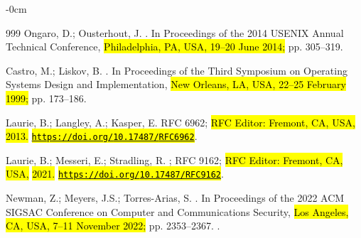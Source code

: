 \documentclass[blockchains,review,accept,moreauthors]{Definitions/mdpi}
\begin{document}
\begin{adjustwidth}{-\extralength}{0cm}
\begin{thebibliography}{999}
Ongaro, D.; Ousterhout, J.
.
\newblock In Proceedings of the 2014 USENIX Annual Technical Conference, \hl{Philadelphia, PA, USA, 19--20 June 2014;}
  pp. 305--319.

Castro, M.; Liskov, B.
.
\newblock In Proceedings of the Third Symposium on Operating Systems Design and
  Implementation, \hl{New Orleans, LA, USA, 22--25 February  1999;} pp. 173--186.

Laurie, B.; Langley, A.; Kasper, E.
 RFC 6962; \hl{RFC Editor: Fremont, CA, USA,} \hl{2013.} %
\newblock \href{https://doi.org/10.17487/RFC6962}{\hl{\mbox{\nolinkurl{https://doi.org/}}}}\allowbreak\href{https://doi.org/10.17487/RFC6962}{\hl{\mbox{\nolinkurl{10.17487/}}}}\allowbreak\href{https://doi.org/10.17487/RFC6962}{\hl{\mbox{\nolinkurl{RFC6962}}}}.


Laurie, B.; Messeri, E.; Stradling, R.
; RFC 9162; \hl{RFC Editor: Fremont, CA, USA,} \hl{2021.} %
\newblock \href{https://doi.org/10.17487/RFC9162}{\hl{\mbox{\nolinkurl{https://doi.org/}}}}\allowbreak\href{https://doi.org/10.17487/RFC9162}{\hl{\mbox{\nolinkurl{10.17487/}}}}\allowbreak\href{https://doi.org/10.17487/RFC9162}{\hl{\mbox{\nolinkurl{RFC9162}}}}.


Newman, Z.; Meyers, J.S.; Torres-Arias, S.
.
\newblock In Proceedings of the 2022 ACM SIGSAC Conference on Computer and
  Communications Security, \hl{Los Angeles, CA, USA, 7--11 November  2022;} pp. 2353--2367.
.


\end{thebibliography}
\end{adjustwidth}
\end{document}
